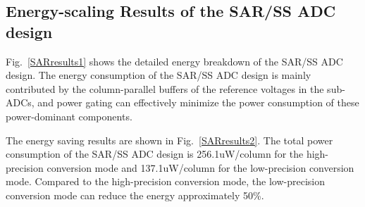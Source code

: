 \subsection{Energy-scaling Results of the SAR/SS ADC design}\label{SAR power}

Fig.~\ref{SARresults1} shows the detailed energy breakdown of the SAR/SS ADC design.
The energy consumption of the SAR/SS ADC design is mainly contributed by the column-parallel 
buffers of the reference voltages in the sub-ADCs, and power gating can effectively minimize 
the power consumption of these power-dominant components. 

The energy saving results are shown in Fig.~\ref{SARresults2}. The total power consumption of 
the SAR/SS ADC design is 256.1uW/column for the high-precision conversion mode and 137.1uW/column 
for the low-precision conversion mode. Compared to the high-precision conversion mode, the low-precision 
conversion mode can reduce the energy approximately 50\%.

